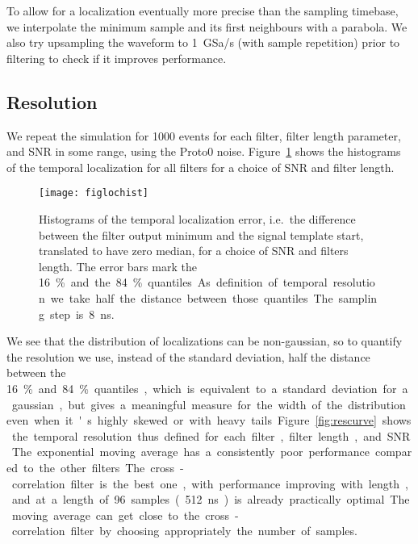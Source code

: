 To allow for a localization eventually more precise than the sampling timebase,
we interpolate the minimum sample and its first neighbours with a parabola. We
also try upsampling the waveform to \SI{1}{GSa/s} (with sample repetition)
prior to filtering to check if it improves performance.

\subsection{Resolution}

We repeat the simulation for 1000 events for each filter, filter length
parameter, and SNR in some range, using the Proto0 noise.
Figure~\ref{fig:lochist} shows the histograms of the temporal localization for
all filters for a choice of SNR and filter length.


\begin{figure}
    \hspace{-0.07\textwidth}
    \texttt{[image: figlochist]}
    
    \caption{Histograms of the temporal localization error, i.e.\ the
    difference between the filter output minimum and the signal template start,
    translated to have zero median, for a choice of SNR and filters length. The
    error bars mark the \SI{16}\% and the \SI{84}\% quantiles. As definition of
    temporal resolution we take half the distance between those quantiles.
    The sampling step is \SI{8}{ns}.}
    
    \label{fig:lochist}
\end{figure}

We see that the distribution of localizations can be non-gaussian, so to
quantify the resolution we use, instead of the standard deviation, half the
distance between the \SI{16}\% and \SI{84}\% quantiles, which is equivalent to
a standard deviation for a gaussian, but gives a meaningful measure for the
width of the distribution even when it's highly skewed or with heavy tails.

Figure~\ref{fig:rescurve} shows the temporal resolution thus defined for each
filter, filter length, and SNR. The exponential moving average has a
consistently poor performance compared to the other filters. The
cross-correlation filter is the best one, with performance improving with
length, and at a length of 96 samples (\SI{512}{ns}) is already practically
optimal. The moving average can get close to the cross-correlation filter by
choosing appropriately the number of samples.

